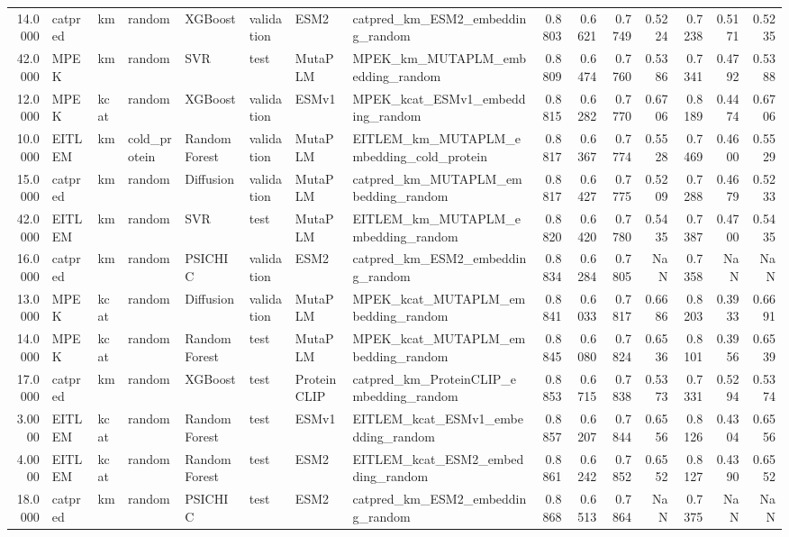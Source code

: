 \begin{tabular}{rlllllllrrrrrrr}
14.0000 & catpred & km & random & XGBoost & validation & ESM2 & catpred_km_ESM2_embedding_random & 0.8803 & 0.6621 & 0.7749 & 0.5224 & 0.7238 & 0.5171 & 0.5235 \\
42.0000 & MPEK & km & random & SVR & test & MutaPLM & MPEK_km_MUTAPLM_embedding_random & 0.8809 & 0.6474 & 0.7760 & 0.5386 & 0.7341 & 0.4792 & 0.5388 \\
12.0000 & MPEK & kcat & random & XGBoost & validation & ESMv1 & MPEK_kcat_ESMv1_embedding_random & 0.8815 & 0.6282 & 0.7770 & 0.6706 & 0.8189 & 0.4474 & 0.6706 \\
10.0000 & EITLEM & km & cold_protein & Random Forest & validation & MutaPLM & EITLEM_km_MUTAPLM_embedding_cold_protein & 0.8817 & 0.6367 & 0.7774 & 0.5528 & 0.7469 & 0.4600 & 0.5529 \\
15.0000 & catpred & km & random & Diffusion & validation & MutaPLM & catpred_km_MUTAPLM_embedding_random & 0.8817 & 0.6427 & 0.7775 & 0.5209 & 0.7288 & 0.4679 & 0.5233 \\
42.0000 & EITLEM & km & random & SVR & test & MutaPLM & EITLEM_km_MUTAPLM_embedding_random & 0.8820 & 0.6420 & 0.7780 & 0.5435 & 0.7387 & 0.4700 & 0.5435 \\
16.0000 & catpred & km & random & PSICHIC & validation & ESM2 & catpred_km_ESM2_embedding_random & 0.8834 & 0.6284 & 0.7805 & NaN & 0.7358 & NaN & NaN \\
13.0000 & MPEK & kcat & random & Diffusion & validation & MutaPLM & MPEK_kcat_MUTAPLM_embedding_random & 0.8841 & 0.6033 & 0.7817 & 0.6686 & 0.8203 & 0.3933 & 0.6691 \\
14.0000 & MPEK & kcat & random & Random Forest & test & MutaPLM & MPEK_kcat_MUTAPLM_embedding_random & 0.8845 & 0.6080 & 0.7824 & 0.6536 & 0.8101 & 0.3956 & 0.6539 \\
17.0000 & catpred & km & random & XGBoost & test & ProteinCLIP & catpred_km_ProteinCLIP_embedding_random & 0.8853 & 0.6715 & 0.7838 & 0.5373 & 0.7331 & 0.5294 & 0.5374 \\
3.0000 & EITLEM & kcat & random & Random Forest & test & ESMv1 & EITLEM_kcat_ESMv1_embedding_random & 0.8857 & 0.6207 & 0.7844 & 0.6556 & 0.8126 & 0.4304 & 0.6556 \\
4.0000 & EITLEM & kcat & random & Random Forest & test & ESM2 & EITLEM_kcat_ESM2_embedding_random & 0.8861 & 0.6242 & 0.7852 & 0.6552 & 0.8127 & 0.4390 & 0.6552 \\
18.0000 & catpred & km & random & PSICHIC & test & ESM2 & catpred_km_ESM2_embedding_random & 0.8868 & 0.6513 & 0.7864 & NaN & 0.7375 & NaN & NaN \\

\end{tabular}
